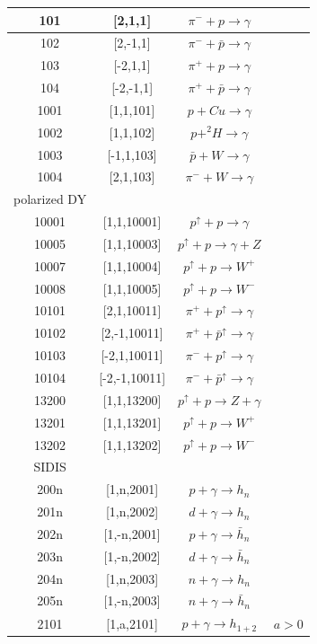 \documentclass[prd,nofootinbib,eqsecnum,final]{revtex4}
\renewcommand{\(}{\left(}
\renewcommand{\)}{\right)}
\renewcommand{\[}{\left[}
\renewcommand{\]}{\right]}
\begin{document}
\begin{center}
\begin{longtable}{||c|c||c|p{8cm}||}
101 & [2,1,1] & $\pi^-+p\to \gamma$ &
\\\hline
102 & [2,-1,1] & $\pi^-+\bar p\to \gamma$ &
\\\hline
103 & [-2,1,1] & $\pi^++p\to \gamma$ &
\\\hline
104 & [-2,-1,1] & $\pi^++\bar p\to \gamma$ &
\\\hline
1001 & [1,1,101] & $p+Cu\to \gamma$ & 
\\\hline
1002 & [1,1,102] & $p+^2H\to \gamma$ & 
\\\hline
1003 & [-1,1,103] & $\bar p+W\to \gamma$ & 
\\\hline
1004 & [2,1,103] & $\pi^-+W\to \gamma$ & 
\\\hline\hline
polarized DY
\\\hline\hline
10001 & [1,1,10001] & $p^\uparrow+p\to \gamma$ & 
\\\hline
10005 & [1,1,10003] & $p^\uparrow+p\to \gamma+Z$ & 
\\\hline
10007 & [1,1,10004] & $p^\uparrow+p\to W^+$ & 
\\\hline
10008 & [1,1,10005] & $p^\uparrow+p\to W^-$ & 
\\\hline
10101 & [2,1,10011] & $\pi^++p^\uparrow\to \gamma$ & 
\\\hline
10102 & [2,-1,10011] & $\pi^++\bar p^\uparrow\to \gamma$ & 
\\\hline
10103 & [-2,1,10011] & $\pi^-+p^\uparrow\to \gamma$ & 
\\\hline
10104 & [-2,-1,10011] & $\pi^-+\bar p^\uparrow\to \gamma$ & 
\\\hline
13200 & [1,1,13200] & $p^\uparrow+p\to Z+\gamma$ & 
\\\hline
13201 & [1,1,13201] & $p^\uparrow+p\to W^+$ & 
\\\hline
13202 & [1,1,13202] & $p^\uparrow+p\to W^-$ & 
\\\hline\hline
 SIDIS
\\\hline\hline
200n & [1,n,2001] & $p+\gamma\to h_n$ & 
\\\hline
201n & [1,n,2002] & $d+\gamma\to h_n$ & 
\\\hline
202n & [1,-n,2001] & $p+\gamma\to \bar h_n$ & 
\\\hline
203n & [1,-n,2002] & $d+\gamma\to \bar h_n$ & 
\\\hline
204n & [1,n,2003] & $n+\gamma\to h_n$ & 
\\\hline
205n & [1,-n,2003] & $n+\gamma\to \bar h_n$ & 
\\\hline
2101 & [1,a,2101] & $p+\gamma\to h_{1+2}$ &  $a>0$
\\\hline

\end{longtable}
\end{center}
\end{document}
